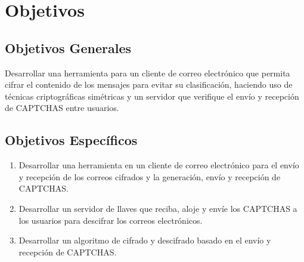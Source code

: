 \documentclass[12pt,oneside,onecolumn,openany]{report}
\begin{document}
\chapter{Objetivos} %



    \section{Objetivos Generales} %
    
    
      Desarrollar  una  herramienta  para  un  cliente  de  correo  electrónico  que  permita  cifrar  el 
      contenido  de  los  mensajes  para  evitar  su  clasificación, haciendo uso de técnicas criptográficas simétricas y un servidor que verifique el envío y recepción de CAPTCHAS entre usuarios. 
    \section{Objetivos Específicos} %
    
    
        \begin{enumerate}
         \item Desarrollar  una  herramienta  en  un  cliente  de  correo  electrónico  para  el  envío  y recepción  de   los   correos  cifrados   y   la  generación,  envío  y  recepción  de CAPTCHAS. 
         \item Desarrollar un servidor de llaves que reciba, aloje y envíe los CAPTCHAS a los usuarios para descifrar los correos electrónicos.       
         \item Desarrollar un algoritmo de cifrado y descifrado basado en el envío y recepción de CAPTCHAS.
        \end{enumerate}
        
\end{document}
